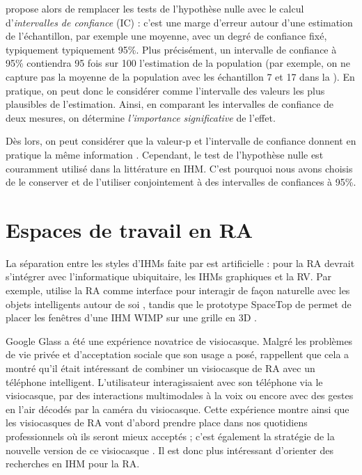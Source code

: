\cite{Dragicevic2016} propose alors de remplacer les tests de l'hypothèse nulle avec le calcul d'\emph{intervalles de confiance} (IC) : c'est une marge d'erreur autour d'une estimation de l'échantillon, par exemple une moyenne, avec un degré de confiance fixé, typiquement typiquement 95\%. Plus précisément, un intervalle de confiance à 95\% contiendra 95 fois sur 100 l'estimation de la population (par exemple, on ne capture pas la moyenne de la population avec les échantillon 7 et 17 dans la ). En pratique, on peut donc le considérer comme l'intervalle des valeurs les plus plausibles de l'estimation. Ainsi, en comparant les intervalles de confiance de deux mesures, on détermine \emph{l'importance significative} de l'effet.

Dès lors, on peut considérer que la valeur-p et l'intervalle de confiance donnent en pratique la même information \cite{Dragicevic2016}. Cependant, le test de l'hypothèse nulle est couramment utilisé dans la littérature en IHM. C'est pourquoi nous avons choisis de le conserver et de l'utiliser conjointement à des intervalles de confiances à 95\%.


\section{Espaces de travail en RA}
\label{sec:litterature_ar_worspaces}

La séparation entre les styles d'IHMs faite par \cite{Rekimoto1995}  est artificielle : pour \cite{Billinghurst2005} la RA devrait s'intégrer avec l'informatique ubiquitaire, les IHMs graphiques et la RV. Par exemple, \cite{Heun2013} utilise la RA comme interface pour interagir de façon naturelle avec les objets intelligents autour de soi , tandis que le prototype SpaceTop de \cite{Lee2013} permet de placer les fenêtres d'une IHM WIMP sur une grille en 3D .


Google Glass a été une expérience novatrice de visiocasque. Malgré les problèmes de vie privée et d'acceptation sociale que son usage a posé, \cite{Koelle2015} rappellent que cela a montré qu'il était intéressant de combiner un visiocasque de RA avec un téléphone intelligent. L'utilisateur interagissaient avec son téléphone via le visiocasque, par des interactions multimodales à la voix ou encore avec des gestes en l'air décodés par la caméra du visiocasque. Cette expérience montre ainsi que les visiocasques de RA vont d'abord prendre place dans nos quotidiens professionnels où ils seront mieux acceptés ; c'est également la stratégie de la nouvelle version de ce visiocasque \cite{Levy2017}. Il est donc plus intéressant d'orienter des recherches en IHM pour la RA.

